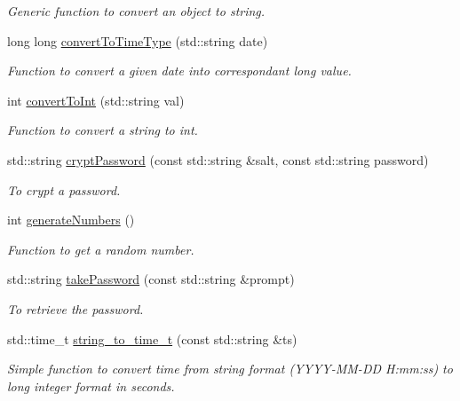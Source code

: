\begin{DoxyCompactItemize}
\begin{DoxyCompactList}\small\item\em Generic function to convert an object to string. \item\end{DoxyCompactList}\item 
long long \hyperlink{namespacevishnu_ae4208edfb8924443b0971e68cccfce02}{convertToTimeType} (std::string date)
\begin{DoxyCompactList}\small\item\em Function to convert a given date into correspondant long value. \item\end{DoxyCompactList}\item 
int \hyperlink{namespacevishnu_ac1899fb2792ddd63a003a06081fc9066}{convertToInt} (std::string val)
\begin{DoxyCompactList}\small\item\em Function to convert a string to int. \item\end{DoxyCompactList}\item 
std::string \hyperlink{namespacevishnu_a6315b6f5e86d48f4c75dc73d08348edf}{cryptPassword} (const std::string \&salt, const std::string password)
\begin{DoxyCompactList}\small\item\em To crypt a password. \item\end{DoxyCompactList}\item 
int \hyperlink{namespacevishnu_a93bc913d891933b4f9d7bc0382f72425}{generateNumbers} ()
\begin{DoxyCompactList}\small\item\em Function to get a random number. \item\end{DoxyCompactList}\item 
std::string \hyperlink{namespacevishnu_a699510f2ba6cb03bd9a6f3696abd9860}{takePassword} (const std::string \&prompt)
\begin{DoxyCompactList}\small\item\em To retrieve the password. \item\end{DoxyCompactList}\item 
std::time\_\-t \hyperlink{namespacevishnu_ace1a774c9d738133e7cdfe505d358764}{string\_\-to\_\-time\_\-t} (const std::string \&ts)
\begin{DoxyCompactList}\small\item\em Simple function to convert time from string format (YYYY-\/MM-\/DD H:mm:ss) to long integer format in seconds. \item\end{DoxyCompactList}\item 

\end{DoxyCompactItemize}
